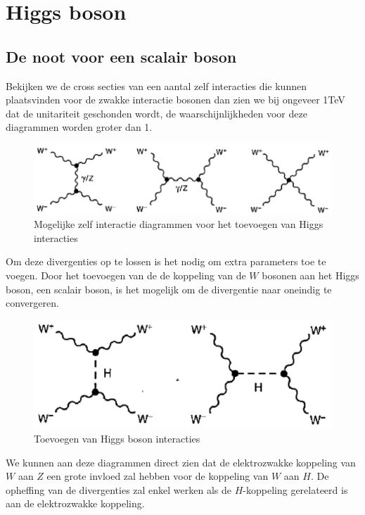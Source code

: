 \documentclass[../main.tex]{subfiles}
\begin{document}
\section{Higgs boson}%
\label{sec:higgs_boson}

\subsection{De noot voor een scalair boson}%
\label{sub:de_noot_voor_een_scalair_boson}

Bekijken we de cross secties van een aantal zelf interacties die kunnen plaatsvinden voor de zwakke interactie bosonen dan zien we bij ongeveer 1TeV dat de unitariteit geschonden wordt, de waarschijnlijkheden voor deze diagrammen worden groter dan 1.

\begin{figure}[h]
    \centering
    \includegraphics[width=0.8\linewidth]{higgs_boson/zwak_zelf_int_geen_H.png}
    \caption{Mogelijke zelf interactie diagrammen voor het toevoegen van Higgs interacties}%
    \label{fig:higgs_boson/zwak_zelf_int_geen_H}
\end{figure}

Om deze divergenties op te lossen is het nodig om extra parameters toe te voegen. Door het toevoegen van de de koppeling van de $W$ bosonen aan het Higgs boson, een scalair boson, is het mogelijk om de divergentie naar oneindig te convergeren.

\begin{figure}[h]
    \centering
    \includegraphics[width=0.6\linewidth]{higgs_boson/zwak_zelf_int_H.png}
    \caption{Toevoegen van Higgs boson interacties}%
    \label{fig:higgs_boson/zwak_zelf_int_H}
\end{figure}

We kunnen aan deze diagrammen direct zien dat de elektrozwakke koppeling van $W$ aan $Z$ een grote invloed zal hebben voor de koppeling van $W$ aan $H$. De opheffing van de divergenties zal enkel werken als de $H$-koppeling gerelateerd is aan de elektrozwakke koppeling.
\end{document}
